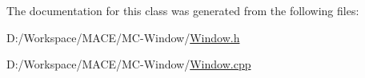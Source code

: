 The documentation for this class was generated from the following files\+:\begin{DoxyCompactItemize}
\item 
D\+:/\+Workspace/\+M\+A\+C\+E/\+M\+C-\/\+Window/\hyperlink{_window_8h}{Window.\+h}\item 
D\+:/\+Workspace/\+M\+A\+C\+E/\+M\+C-\/\+Window/\hyperlink{_window_8cpp}{Window.\+cpp}\end{DoxyCompactItemize}

